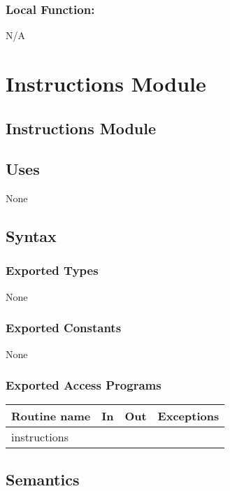 \documentclass[12pt]{article}
\begin{document}
\subsubsection*{Local Function:}

N/A

\newpage

\section {Instructions Module}

\subsection* {Instructions Module}

\subsection* {Uses}

None

\subsection* {Syntax}

\subsubsection* {Exported Types}

None

\subsubsection* {Exported Constants}

None

\subsubsection* {Exported Access Programs}
\begin{tabular}{| l | l | l | p{6cm} |}
\hline
\textbf{Routine name} & \textbf{In} & \textbf{Out} & \textbf{Exceptions}\\
\hline
instructions & ~ & ~ &  \\
\hline
\end{tabular}


\subsection* {Semantics}
\end{document}
